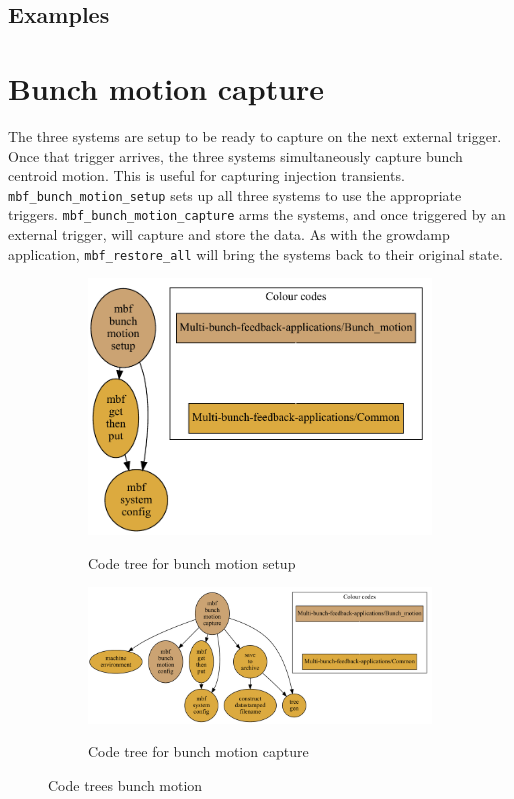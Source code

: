 \documentclass{report}
\begin{document}
\section{Examples}

\chapter{Bunch motion capture}
The three systems are setup to be ready to capture on the next external trigger. Once that trigger arrives, the three systems simultaneously capture bunch centroid motion. This is useful for capturing injection transients. \verb|mbf_bunch_motion_setup| sets up all three systems to use the appropriate triggers. \verb|mbf_bunch_motion_capture| arms the systems, and once triggered by an external trigger, will capture and store the data. As with the growdamp application, \verb|mbf_restore_all| will bring the systems back to their original state.

\begin{figure}[hbt]
\centering
    \begin{subfigure}[b]{0.3\textwidth}
  \includegraphics[width=\textwidth]{mbf_bunch_motion_setup.pdf}\\
  \caption{Code tree for bunch motion setup}\label{fig:code_tree_bunch_motion_setup}
    \end{subfigure}
       \begin{subfigure}[b]{0.6\textwidth}
  \includegraphics[width=\textwidth]{mbf_bunch_motion_capture.pdf}\\
  \caption{Code tree for bunch motion capture}\label{fig:code_tree_bunch_motion_capture}
    \end{subfigure}
    \caption{Code trees bunch motion}\label{fig:bunch_motion_code_trees}
\end{figure}
\end{document}
